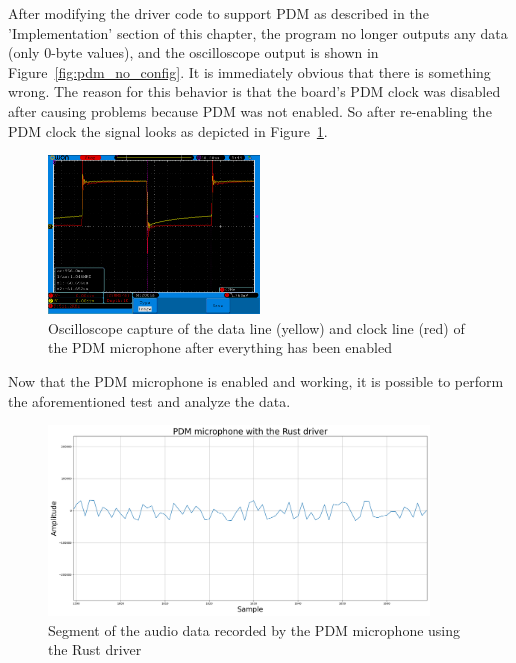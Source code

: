 After modifying the driver code to support PDM as described in the 'Implementation' section of this chapter,
the program no longer outputs any data (only 0-byte values), and the oscilloscope output is shown in Figure~\ref{fig:pdm_no_config}.
It is immediately obvious that there is something wrong.
The reason for this behavior is that the board's PDM clock was disabled after causing problems because PDM was not enabled.
So after re-enabling the PDM clock the signal looks as depicted in Figure~\ref{fig:pdm_working}.

\begin{figure}[H]
    \begin{center}
        \includegraphics[width=0.5\textwidth]{figures/pdm_working.png}
    \end{center}
    \caption[Oscilloscope capture of the data line (yellow) and clock line (red) of the PDM microphone after everything has been enabled]{Oscilloscope capture of the data line (yellow) and clock line (red) of the PDM microphone after everything has been enabled}
    \label{fig:pdm_working}
\end{figure}

Now that the PDM microphone is enabled and working, it is possible to perform the aforementioned test and analyze the data.

\begin{figure}[H]
    \centering
    \includegraphics[width=0.9\textwidth]{figures/pdm/pdm_rust.png}
    \caption[Segment of the audio data recorded by the PDM microphone using the Rust driver]{Segment of the audio data recorded by the PDM microphone using the Rust driver}
    \label{fig:pdm_rust}
\end{figure}

